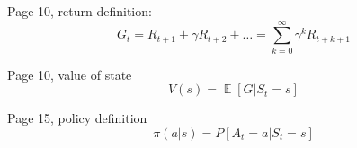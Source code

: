 \documentclass{article}
\DeclareMathOperator{\E}{\mathbb{E}}
\begin{document}
Page 10, return definition:
\begin{equation*}
G_t = R_{t+1}+\gamma R_{t+2}+\ldots = \sum^{\infty}_{k=0}{\gamma^kR_{t+k+1}}
\end{equation*}

Page 10, value of state
\begin{equation*}
V(s) = \E[G|S_t=s]
\end{equation*}


Page 15, policy definition
\begin{equation*}
  \pi(a|s)=P[A_t=a|S_t=s]
\end{equation*}
\end{document}
